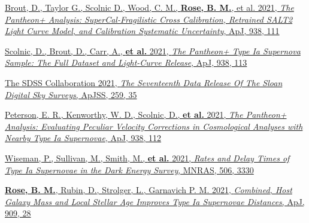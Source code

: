 \documentclass[margin]{res}
\begin{document}
\begin{resume}
\hangindent=15pt 
\href{https://ui.adsabs.harvard.edu/abs/2021arXiv211203864B/abstract}{Brout, D., Taylor G., Scolnic D., Wood, C. M., \textbf{Rose, B. M.}, et al. 2021, {\sl The Pantheon+ Analysis: SuperCal-Fragilistic Cross Calibration, Retrained SALT2 Light Curve Model, and Calibration Systematic Uncertainty}, ApJ, 938, 111} 
\vspace{-12pt}

\hangindent=15pt 
\href{https://ui.adsabs.harvard.edu/abs/2021arXiv211203863S/abstract}{Scolnic, D., Brout, D., Carr, A., {\bf et al.} 2021, {\sl The Pantheon+ Type Ia Supernova Sample: The Full Dataset and Light-Curve Release}, ApJ, 938, 113}
\vspace{-12pt}

\hangindent=15pt 
\href{https://ui.adsabs.harvard.edu/abs/2022ApJS..259...35A/abstract}{The SDSS Collaboration 2021, {\sl The Seventeenth Data Release Of The Sloan Digital Sky Surveys}, ApJSS, 259, 35} 
\vspace{-12pt}

\hangindent=15pt 
\href{https://ui.adsabs.harvard.edu/abs/2021arXiv211003487P/abstract}{Peterson, E. R., Kenworthy, W. D.,  Scolnic, D., {\bf et al.} 2021, {\sl The Pantheon+ Analysis: Evaluating Peculiar Velocity Corrections in Cosmological Analyses with Nearby Type Ia Supernovae}, ApJ, 938, 112}
\vspace{-12pt}

\hangindent=15pt 
\href{https://ui.adsabs.harvard.edu/abs/2021MNRAS.tmp.1758W/abstract}{Wiseman, P., Sullivan, M., Smith, M., {\bf et al.} 2021, {\sl Rates and Delay Times of Type Ia Supernovae in the Dark Energy Survey}, MNRAS, 506, 3330} 
\vspace{-12pt}


\hangindent=15pt 
\href{https://ui.adsabs.harvard.edu/abs/2020arXiv201201460R/abstract}{{\bf Rose, B. M.}, Rubin, D., Strolger, L., Garnavich P. M. 2021, {\sl Combined, Host Galaxy Mass and Local Stellar Age Improves Type Ia Supernovae Distances}, ApJ, 909, 28} %
\vspace{-12pt}


\end{resume}
\end{document}
